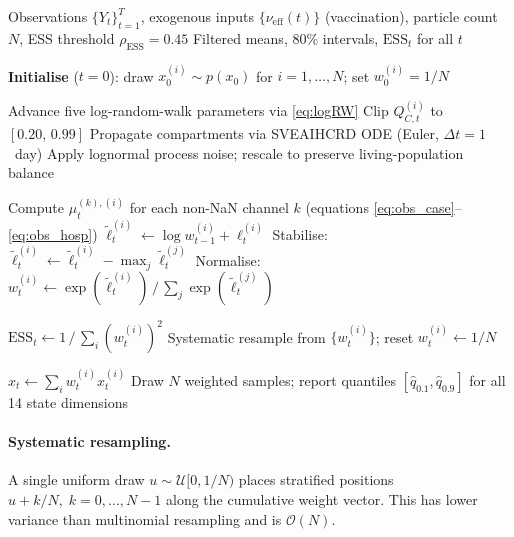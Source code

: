 \documentclass[11pt]{article}
\newcommand{\ESS}{\mathrm{ESS}}
\begin{document}
\begin{algorithm}[H]
\caption{Bootstrap Particle Filter for the SVEAIHCRD model}
\label{alg:bpf}
\footnotesize
\begin{algorithmic}[1]
\Require Observations $\{Y_t\}_{t=1}^T$, exogenous inputs
         $\{\nu_{\mathrm{eff}}(t)\}$ (vaccination), particle count $N$,
         ESS threshold $\rho_{\ESS}=0.45$
\Ensure  Filtered means, 80\% intervals, $\ESS_t$ for all $t$

\medskip
\State \textbf{Initialise} ($t=0$):
       draw $x_0^{(i)}\sim p(x_0)$ for $i=1,\ldots,N$;
       set $w_0^{(i)}=1/N$

  \State {}
  \State Advance five log-random-walk parameters via \eqref{eq:logRW}
  \State Clip $Q_{C,t}^{(i)}$ to $[0.20,\,0.99]$
  \State Propagate compartments via SVEAIHCRD ODE (Euler, $\Delta t=1$~day)
  \State Apply lognormal process noise; rescale to preserve living-population balance

  \medskip
  \State {}
  \State Compute $\mu_t^{(k),(i)}$ for each non-NaN channel $k$
         (equations \eqref{eq:obs_case}--\eqref{eq:obs_hosp})
  \State $\tilde\ell_t^{(i)} \leftarrow \log w_{t-1}^{(i)} + \ell_t^{(i)}$
  \State Stabilise: $\tilde\ell_t^{(i)} \leftarrow \tilde\ell_t^{(i)}
         - \max_j\tilde\ell_t^{(j)}$
  \State Normalise: $w_t^{(i)} \leftarrow
         \exp(\tilde\ell_t^{(i)})\,/\,\sum_j\exp(\tilde\ell_t^{(j)})$

  \medskip
  \State {}
  \State $\ESS_t \leftarrow 1\,/\,\sum_i(w_t^{(i)})^2$
  \If{$\ESS_t < \rho_{\ESS}\cdot N$}
    \State Systematic resample from $\{w_t^{(i)}\}$;
           reset $w_t^{(i)}\leftarrow 1/N$
  \EndIf

  \medskip
  \State {}
  \State $\hat x_t \leftarrow \sum_i w_t^{(i)} x_t^{(i)}$
  \State Draw $N$ weighted samples; report quantiles
         $[\hat q_{0.1},\hat q_{0.9}]$ for all 14 state dimensions
\EndFor
\end{algorithmic}
\end{algorithm}

\paragraph{Systematic resampling.}
A single uniform draw $u\sim\mathcal{U}[0,1/N)$ places stratified
positions $u+k/N,\;k=0,\ldots,N-1$ along the cumulative weight vector.
This has lower variance than multinomial resampling and is $\mathcal{O}(N)$.
\end{document}
